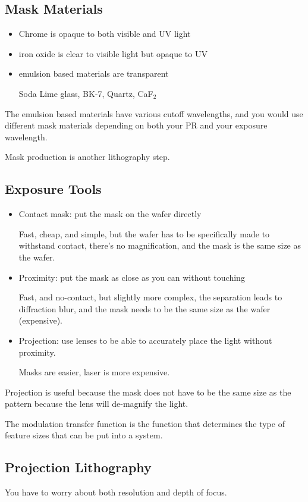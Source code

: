 \documentclass[fleqn]{report}
\begin{document}
\subsection{Mask Materials}
\begin{itemize}
    \item
Chrome is opaque to both visible and UV light
    \item
iron oxide is clear to visible light but opaque to UV 
    \item
    emulsion based materials are transparent 

    Soda Lime glass, BK-7, Quartz, CaF$_2$
\end{itemize}

The emulsion based materials have various cutoff wavelengths, and you would 
use different mask materials depending on both your PR and your exposure 
wavelength. 

Mask production is another lithography step. 

\subsection{Exposure Tools}
\begin{itemize}
    \item 
Contact mask: put the mask on the wafer directly

Fast, cheap, and simple, but the wafer has to be specifically made to withstand 
contact, there's no magnification, and the mask is the same size as the wafer.
    \item 
    Proximity: put the mask as close as you can without touching 

    Fast, and no-contact, but slightly more complex, the separation 
    leads to diffraction blur, and the mask needs to be the same size as 
    the wafer (expensive).
    \item 
    Projection: use lenses to be able to accurately place the 
    light without proximity. 

    Masks are easier, laser is more expensive.
\end{itemize}

Projection is useful because the mask does not have to be the same size 
as the pattern because the lens will de-magnify the light.

The modulation transfer function is the function that determines 
the type of feature sizes that can be put into a system.

\subsection{Projection Lithography}
You have to worry about both resolution and depth of focus.
\end{document}
